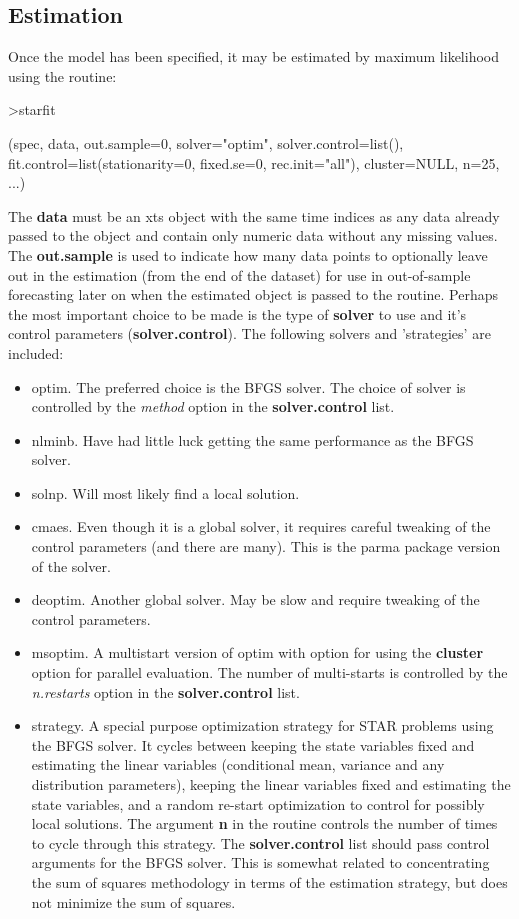 \subsection{Estimation}
Once the model has been specified, it may be estimated by maximum likelihood
using the  routine:
\begin{Schunk}
\begin{Sinput}
>starfit
\end{Sinput}
\begin{Soutput}
(spec, data, out.sample=0, solver="optim", solver.control=list(), 
fit.control=list(stationarity=0, fixed.se=0, rec.init="all"), 
cluster=NULL, n=25, ...)
\end{Soutput}
\end{Schunk}
The \textbf{data} must be an xts object with the same time indices as any data
already passed to the  object and contain only numeric data
without any missing values. The \textbf{out.sample} is used to indicate how many
data points to optionally leave out in the estimation (from the end of the
dataset) for use in out-of-sample forecasting later on when the estimated object
is passed to the  routine. Perhaps the most important choice
to be made is the type of \textbf{solver} to use and it's control parameters
(\textbf{solver.control}). The following solvers and 'strategies' are included:
\begin{itemize}
  \item optim. The preferred choice is the BFGS solver. The choice of solver is
  controlled by the \emph{method} option in the \textbf{solver.control} list.
  \item nlminb. Have had little luck getting the same performance as the BFGS
  solver.
  \item solnp. Will most likely find a local solution.
  \item cmaes. Even though it is a global solver, it requires careful tweaking
  of the control parameters (and there are many). This is the parma package
  version of the solver.
  \item deoptim. Another global solver. May be slow and require tweaking of the
  control parameters.
  \item msoptim. A multistart version of optim with option for using the
  \textbf{cluster} option for parallel evaluation. The number of
  multi-starts is controlled by the \emph{n.restarts} option in the
  \textbf{solver.control} list.
  \item strategy. A special purpose optimization strategy for STAR problems
  using the BFGS solver. It cycles between keeping the state variables fixed and
  estimating the linear variables (conditional mean, variance and any
  distribution parameters), keeping the linear variables fixed and estimating
  the state variables, and a random re-start optimization to control for
  possibly local solutions. The argument \textbf{n} in the routine controls the
  number of times to cycle through this strategy. The \textbf{solver.control}
  list should pass control arguments for the BFGS solver. This is somewhat
  related to concentrating the sum of squares methodology in terms of the
  estimation strategy, but does not minimize the sum of squares.
\end{itemize}
